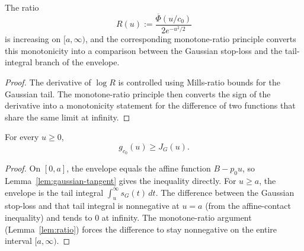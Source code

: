 \begin{lemma}\label{lem:ratio}
\leanok
{}\leanok
The ratio
\[
  R(u) := \frac{\overline{\Phi}(u/c_0)}{2e^{-u^2/2}}
\]
is increasing on $[a,\infty)$, and the corresponding monotone-ratio principle
converts this monotonicity into a comparison between the Gaussian
stop-loss and the tail-integral branch of the envelope.
\end{lemma}

\begin{proof}\leanok
The derivative of $\log R$ is controlled using Mills-ratio bounds for the
Gaussian tail. The monotone-ratio principle then converts the sign of the
derivative into a monotonicity statement for the difference of two functions
that share the same limit at infinity.
\end{proof}

\begin{theorem}\label{thm:gauss-ge-J}
\leanok
{}
For every $u \ge 0$,
\[
  g_{c_0}(u) \ge J_G(u).
\]
\end{theorem}

\begin{proof}\leanok
On $[0,a]$, the envelope equals the affine function
$B-p_0u$, so Lemma~\ref{lem:gaussian-tangent} gives the inequality
directly. For $u \ge a$, the envelope is the tail integral
$\int_u^\infty s_G(t)\,dt$. The difference between the Gaussian stop-loss and
that tail integral is nonneg\-ative at $u=a$ (from the affine-contact
inequality) and tends to $0$ at infinity. The monotone-ratio argument
(Lemma~\ref{lem:ratio}) forces the difference to stay nonnegative
on the entire interval $[a,\infty)$.
\end{proof}
